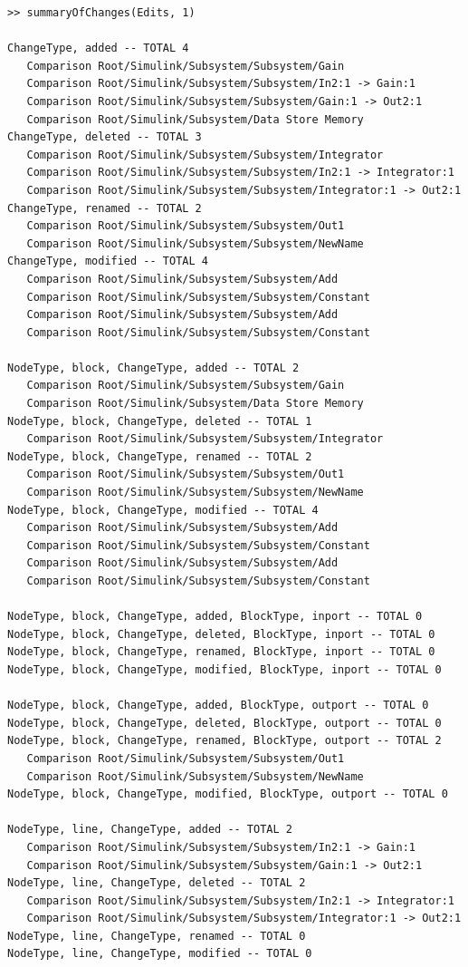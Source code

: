 \documentclass{article}
\begin{document}
\begin{lstlisting}
>> summaryOfChanges(Edits, 1)

ChangeType, added -- TOTAL 4
   Comparison Root/Simulink/Subsystem/Subsystem/Gain
   Comparison Root/Simulink/Subsystem/Subsystem/In2:1 -> Gain:1
   Comparison Root/Simulink/Subsystem/Subsystem/Gain:1 -> Out2:1
   Comparison Root/Simulink/Subsystem/Data Store Memory
ChangeType, deleted -- TOTAL 3
   Comparison Root/Simulink/Subsystem/Subsystem/Integrator
   Comparison Root/Simulink/Subsystem/Subsystem/In2:1 -> Integrator:1
   Comparison Root/Simulink/Subsystem/Subsystem/Integrator:1 -> Out2:1
ChangeType, renamed -- TOTAL 2
   Comparison Root/Simulink/Subsystem/Subsystem/Out1
   Comparison Root/Simulink/Subsystem/Subsystem/NewName
ChangeType, modified -- TOTAL 4
   Comparison Root/Simulink/Subsystem/Subsystem/Add
   Comparison Root/Simulink/Subsystem/Subsystem/Constant
   Comparison Root/Simulink/Subsystem/Subsystem/Add
   Comparison Root/Simulink/Subsystem/Subsystem/Constant

NodeType, block, ChangeType, added -- TOTAL 2
   Comparison Root/Simulink/Subsystem/Subsystem/Gain
   Comparison Root/Simulink/Subsystem/Data Store Memory
NodeType, block, ChangeType, deleted -- TOTAL 1
   Comparison Root/Simulink/Subsystem/Subsystem/Integrator
NodeType, block, ChangeType, renamed -- TOTAL 2
   Comparison Root/Simulink/Subsystem/Subsystem/Out1
   Comparison Root/Simulink/Subsystem/Subsystem/NewName
NodeType, block, ChangeType, modified -- TOTAL 4
   Comparison Root/Simulink/Subsystem/Subsystem/Add
   Comparison Root/Simulink/Subsystem/Subsystem/Constant
   Comparison Root/Simulink/Subsystem/Subsystem/Add
   Comparison Root/Simulink/Subsystem/Subsystem/Constant

NodeType, block, ChangeType, added, BlockType, inport -- TOTAL 0
NodeType, block, ChangeType, deleted, BlockType, inport -- TOTAL 0
NodeType, block, ChangeType, renamed, BlockType, inport -- TOTAL 0
NodeType, block, ChangeType, modified, BlockType, inport -- TOTAL 0

NodeType, block, ChangeType, added, BlockType, outport -- TOTAL 0
NodeType, block, ChangeType, deleted, BlockType, outport -- TOTAL 0
NodeType, block, ChangeType, renamed, BlockType, outport -- TOTAL 2
   Comparison Root/Simulink/Subsystem/Subsystem/Out1
   Comparison Root/Simulink/Subsystem/Subsystem/NewName
NodeType, block, ChangeType, modified, BlockType, outport -- TOTAL 0

NodeType, line, ChangeType, added -- TOTAL 2
   Comparison Root/Simulink/Subsystem/Subsystem/In2:1 -> Gain:1
   Comparison Root/Simulink/Subsystem/Subsystem/Gain:1 -> Out2:1
NodeType, line, ChangeType, deleted -- TOTAL 2
   Comparison Root/Simulink/Subsystem/Subsystem/In2:1 -> Integrator:1
   Comparison Root/Simulink/Subsystem/Subsystem/Integrator:1 -> Out2:1
NodeType, line, ChangeType, renamed -- TOTAL 0
NodeType, line, ChangeType, modified -- TOTAL 0
\end{lstlisting}
\end{document}

